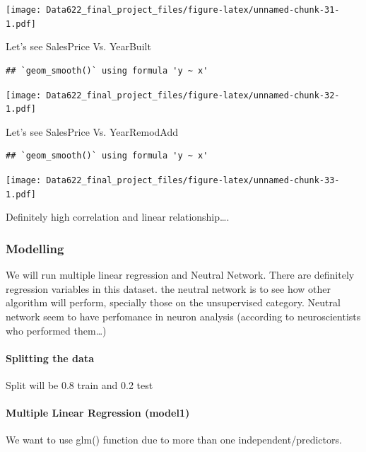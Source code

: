 \documentclass[
]{article}
\begin{document}
\texttt{[image: Data622\_final\_project\_files/figure-latex/unnamed-chunk-31-1.pdf]}

Let's see SalesPrice Vs. YearBuilt

\begin{verbatim}
## `geom_smooth()` using formula 'y ~ x'
\end{verbatim}

\texttt{[image: Data622\_final\_project\_files/figure-latex/unnamed-chunk-32-1.pdf]}

Let's see SalesPrice Vs. YearRemodAdd

\begin{verbatim}
## `geom_smooth()` using formula 'y ~ x'
\end{verbatim}

\texttt{[image: Data622\_final\_project\_files/figure-latex/unnamed-chunk-33-1.pdf]}

Definitely high correlation and linear relationship\ldots.

\hypertarget{modelling}{%
\subsubsection{Modelling}\label{modelling}}

We will run multiple linear regression and Neutral Network. There are
definitely regression variables in this dataset. the neutral network is
to see how other algorithm will perform, specially those on the
unsupervised category. Neutral network seem to have perfomance in neuron
analysis (according to neuroscientists who performed them\ldots)

\hypertarget{splitting-the-data}{%
\paragraph{Splitting the data}\label{splitting-the-data}}

Split will be 0.8 train and 0.2 test

\hypertarget{multiple-linear-regression-model1}{%
\paragraph{Multiple Linear Regression
(model1)}\label{multiple-linear-regression-model1}}

We want to use glm() function due to more than one
independent/predictors.
\end{document}
